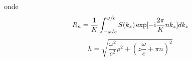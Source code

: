 onde 
\begin{equation}\label{eqs2}
  R_n=\frac{1}{K}\int_{-\omega/c}^{\omega/c} S(k_z)\exp[-{\rm i}\frac{2\pi}{K}n k_z]dk_z
\end{equation}
\begin{equation}\label{eqs3}
h = \sqrt{\frac{\omega^2}{c^2}\rho^2+(z\frac{\omega}{c}+\pi n)^2}
\end{equation}
\begin{figure}[h]
\centering
{}
\centering
{}

\end{figure}

